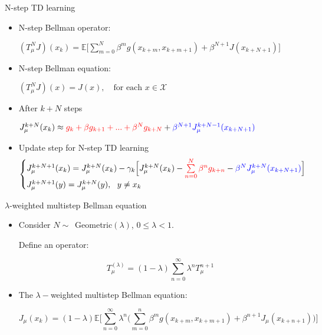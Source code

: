 \documentclass{beamer}
\def\X{{\mathcal X}}
\def\E{{\mathbb E}}
\newcommand{\blue}[1]{\textcolor{blue}{#1}}
\newcommand{\red}[1]{\textcolor{red}{#1}}
\begin{document}
\begin{frame}{N-step TD learning}
\begin{itemize}

\item N-step Bellman operator:  
\begin{center}
$
(T^N_\mu J)(x_k) = \E\Big[\sum\limits_{m=0}^N \beta^m g(x_{k+m}, x_{k+m+1}) +\beta^{N+1} J(x_{k+N+1})\Big]
$
\end{center}
\item N-step Bellman equation:
\begin{center}
$
(T^N_\mu J)(x) = J(x), ~~~\text{ for each }x\in \X
$
\end{center}

      
    \item After  $k+N$ steps 
    \begin{center}
       $J^{k+N}_\mu(x_{k}) \approx   \red{g_{k}+\beta g_{k+1}+...+\beta^{N} g_{k+N}} + \blue{\beta^{N+1} J^{k+N-1}_\mu(x_{k+N+1})}$
    \end{center}

    \item Update step for N-step TD learning
    $$
  \begin{cases}
  J^{k+N+1}_\mu(x_k) = J^{k+N}_\mu(x_k) - \gamma_k \Big[J^{k+N}_\mu(x_k) - \red{\sum\limits_{n=0}^{N}\beta^{n} g_{k+n}} -\blue{\beta^N J^{k+N}_\mu(x_{k+N+1})}\Big]\\
  J^{k+N+1}_\mu(y) = J^{k+N}_\mu(y), ~~y\neq x_k
  \end{cases}
 $$
  








\end{itemize}
\end{frame}


\begin{frame}{$\lambda$-weighted multistep Bellman equation} 


\begin{itemize}
  \item Consider $N\sim$~Geometric$(\lambda)$, $0\leq \lambda < 1$.

  Define an operator:

  \begin{equation*}
  T_\mu^{(\lambda)} = (1-\lambda)\sum\limits_{n=0}^\infty \lambda^n T_\mu^{n+1}
  \end{equation*}
\item The $\lambda-$weighted multistep Bellman equation:


 
  
  $$
  J_\mu(x_k) = (1-\lambda) \E\Big[ \sum\limits_{n=0}^\infty \lambda^n \Big( \sum\limits_{m=0}^{n} \beta^m g(x_{k+m}, x_{k+m+1})+\beta^{n+1} J_\mu (x_{k+n+1})\Big) \Big]
  $$
 
 

\end{itemize}

\end{frame}
\end{document}
